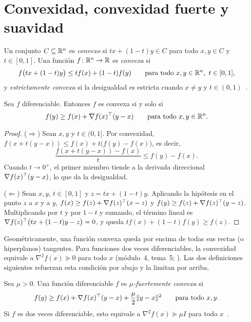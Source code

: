 \section{Convexidad, convexidad fuerte y suavidad}

\begin{definicion}
Un conjunto $C\subseteq\mathbb{R}^{n}$ es \emph{convexo} si $t x+(1-t)y\in C$ para todo $x,y\in C$ y $t\in[0,1]$. Una función $f\colon\mathbb{R}^{n}\to\mathbb{R}$ es \emph{convexa} si
\[
f\bigl(tx+(1-t)y\bigr)\le t f(x)+(1-t)f(y)\qquad\text{para todo } x,y\in\mathbb{R}^{n},\ t\in[0,1],
\]
y \emph{estrictamente convexa} si la desigualdad es estricta cuando $x\ne y$ y $t\in(0,1)$~\cite[cap.~2 y §3.1]{bv}.
\end{definicion}

\begin{teorema}\label{teo:primer-orden}
Sea $f$ diferenciable. Entonces $f$ es convexa si y solo si
\[
f(y)\ge f(x)+\nabla f(x)^{\top}(y-x)\qquad\text{para todo } x,y\in\mathbb{R}^{n}.
\]
\end{teorema}

\begin{proof}
($\Rightarrow$) Sean $x,y$ y $t\in(0,1]$. Por convexidad, $f(x+t(y-x))\le f(x)+t\bigl(f(y)-f(x)\bigr)$, es decir,
\[
\frac{f(x+t(y-x))-f(x)}{t}\le f(y)-f(x).
\]
Cuando $t\to 0^{+}$, el primer miembro tiende a la derivada direccional $\nabla f(x)^{\top}(y-x)$, lo que da la desigualdad.

($\Leftarrow$) Sean $x,y$, $t\in[0,1]$ y $z=tx+(1-t)y$. Aplicando la hipótesis en el punto $z$ a $x$ y a $y$,
$f(x)\ge f(z)+\nabla f(z)^{\top}(x-z)$ y $f(y)\ge f(z)+\nabla f(z)^{\top}(y-z)$. Multiplicando por $t$ y por $1-t$ y sumando, el término lineal es $\nabla f(z)^{\top}\bigl(tx+(1-t)y-z\bigr)=0$, y queda $tf(x)+(1-t)f(y)\ge f(z)$.
\end{proof}

Geométricamente, una función convexa queda por encima de todas sus rectas (o hiperplanos) tangentes. Para funciones dos veces diferenciables, la convexidad equivale a $\nabla^{2}f(x)\succeq 0$ para todo $x$ (módulo~4, tema~5; \cite[§3.1]{bv}). Las dos definiciones siguientes refuerzan esta condición por abajo y la limitan por arriba.

\begin{definicion}\label{def:fuerte}
Sea $\mu>0$. Una función diferenciable $f$ es \emph{$\mu$-fuertemente convexa} si
\[
f(y)\ge f(x)+\nabla f(x)^{\top}(y-x)+\frac{\mu}{2}\lVert y-x\rVert^{2}\qquad\text{para todo } x,y.
\]
Si $f$ es dos veces diferenciable, esto equivale a $\nabla^{2}f(x)\succeq\mu I$ para todo $x$~\cite[§9.1]{bv}.
\end{definicion}

